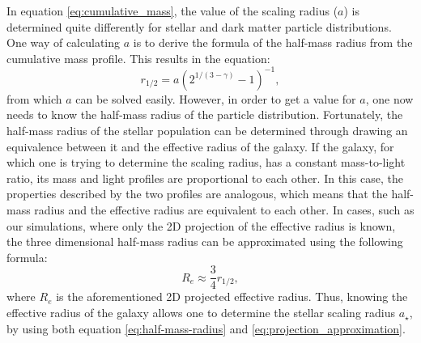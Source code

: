 \documentclass[english, twoside]{HYgradu}
\begin{document}
In equation \ref{eq:cumulative_mass}, the value of the scaling radius ($a$) is determined quite differently for stellar and dark matter particle distributions. One way of calculating $a$ is to derive the formula of the half-mass radius from the cumulative mass profile. This results in the equation:
\begin{equation}
r_{1/2} = a \left( 2^{1/(3-\gamma)}-1 \right)^{-1}, \label{eq:half-mass-radius}
\end{equation}
from which $a$ can be solved easily. However, in order to get a value for $a$, one now needs to know the half-mass radius of the particle distribution. Fortunately, the half-mass radius of the stellar population can be determined through drawing an equivalence between it and the effective radius of the galaxy. If the galaxy, for which one is trying to determine the scaling radius, has a constant mass-to-light ratio, its mass and light profiles are proportional to each other. In this case, the properties described by the two profiles are analogous, which means that the half-mass radius and the effective radius are equivalent to each other. In cases, such as our simulations, where only the 2D projection of the effective radius is known, the three dimensional half-mass radius can be approximated using the following formula:
\begin{equation}
R_e \approx \frac{3}{4} r_{1/2}, \label{eq:projection_approximation}
\end{equation} 
where $R_e$ is the aforementioned 2D projected effective radius. Thus, knowing the effective radius of the galaxy allows one to determine the stellar scaling radius $a_\star$, by using both equation \ref{eq:half-mass-radius} and \ref{eq:projection_approximation}.
\end{document}
